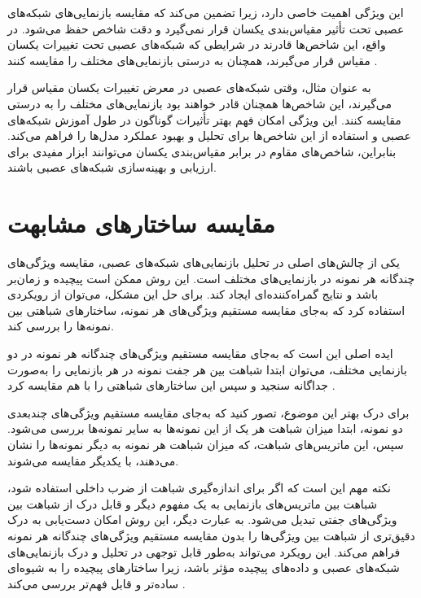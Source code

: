این ویژگی اهمیت خاصی دارد، زیرا تضمین می‌کند که مقایسه بازنمایی‌های شبکه‌های عصبی تحت تأثیر مقیاس‌بندی یکسان قرار نمی‌گیرد و دقت شاخص حفظ می‌شود. در واقع، این شاخص‌ها قادرند در شرایطی که شبکه‌های عصبی تحت تغییرات یکسان مقیاس قرار می‌گیرند، همچنان به درستی بازنمایی‌های مختلف را مقایسه کنند
\cite{kornblith2019similarity}.

به عنوان مثال، وقتی شبکه‌های عصبی در معرض تغییرات یکسان مقیاس قرار می‌گیرند، این شاخص‌ها همچنان قادر خواهند بود بازنمایی‌های مختلف را به درستی مقایسه کنند. این ویژگی امکان فهم بهتر تأثیرات گوناگون در طول آموزش شبکه‌های عصبی و استفاده از این شاخص‌ها برای تحلیل و بهبود عملکرد مدل‌ها را فراهم می‌کند. بنابراین، شاخص‌های مقاوم در برابر مقیاس‌بندی یکسان می‌توانند ابزار مفیدی برای ارزیابی و بهینه‌سازی شبکه‌های عصبی باشند.



\section{مقایسه ساختارهای مشابهت}
یکی از چالش‌های اصلی در تحلیل بازنمایی‌های شبکه‌های عصبی، مقایسه ویژگی‌های چندگانه هر نمونه در بازنمایی‌های مختلف است. این روش ممکن است پیچیده و زمان‌بر باشد و نتایج گمراه‌کننده‌ای ایجاد کند. برای حل این مشکل، می‌توان از رویکردی استفاده کرد که به‌جای مقایسه مستقیم ویژگی‌های هر نمونه، ساختارهای شباهتی بین نمونه‌ها را بررسی کند.

ایده اصلی این است که به‌جای مقایسه مستقیم ویژگی‌های چندگانه هر نمونه در دو بازنمایی مختلف، می‌توان ابتدا شباهت بین هر جفت نمونه در هر بازنمایی را به‌صورت جداگانه سنجید و سپس این ساختارهای شباهتی را با هم مقایسه کرد
\cite{kornblith2019similarity}.

برای درک بهتر این موضوع، تصور کنید که به‌جای مقایسه مستقیم ویژگی‌های چندبعدی دو نمونه، ابتدا میزان شباهت هر یک از این نمونه‌ها به سایر نمونه‌ها بررسی می‌شود. سپس، این ماتریس‌های شباهت، که میزان شباهت هر نمونه به دیگر نمونه‌ها را نشان می‌دهند، با یکدیگر مقایسه می‌شوند.

نکته مهم این است که اگر برای اندازه‌گیری شباهت از ضرب داخلی استفاده شود، شباهت بین ماتریس‌های بازنمایی به یک مفهوم دیگر و قابل درک از شباهت بین ویژگی‌های جفتی تبدیل می‌شود. به عبارت دیگر، این روش امکان دست‌یابی به درک دقیق‌تری از شباهت بین ویژگی‌ها را بدون مقایسه مستقیم ویژگی‌های چندگانه هر نمونه فراهم می‌کند. این رویکرد می‌تواند به‌طور قابل توجهی در تحلیل و درک بازنمایی‌های شبکه‌های عصبی و داده‌های پیچیده مؤثر باشد، زیرا ساختارهای پیچیده را به شیوه‌ای ساده‌تر و قابل فهم‌تر بررسی می‌کند
\cite{kornblith2019similarity}.



